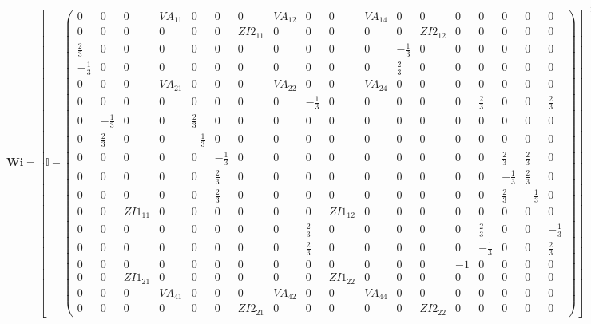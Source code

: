 \[ \mathbf{Wi} =  \left[ \mathbb{I}  - \left(\begin{smallmatrix} 0 & 0
& 0 & VA_{11} & 0 & 0 & 0 & VA_{12} & 0 & 0 & VA_{14} & 0 & 0 & 0 & 0
& 0 & 0 & 0 \\ 0 & 0 & 0 & 0 & 0 & 0 & ZI2_{11} & 0 & 0 & 0 & 0 & 0 &
ZI2_{12} & 0 & 0 & 0 & 0 & 0 \\ \frac{2}{3} & 0 & 0 & 0 & 0 & 0 & 0 &
0 & 0 & 0 & 0 & -\frac{1}{3} & 0 & 0 & 0 & 0 & 0 & 0 \\ -\frac{1}{3} &
0 & 0 & 0 & 0 & 0 & 0 & 0 & 0 & 0 & 0 & \frac{2}{3} & 0 & 0 & 0 & 0 &
0 & 0 \\ 0 & 0 & 0 & VA_{21} & 0 & 0 & 0 & VA_{22} & 0 & 0 & VA_{24} &
0 & 0 & 0 & 0 & 0 & 0 & 0 \\ 0 & 0 & 0 & 0 & 0 & 0 & 0 & 0 &
-\frac{1}{3} & 0 & 0 & 0 & 0 & 0 & \frac{2}{3} & 0 & 0 & \frac{2}{3}
\\ 0 & -\frac{1}{3} & 0 & 0 & \frac{2}{3} & 0 & 0 & 0 & 0 & 0 & 0 & 0
& 0 & 0 & 0 & 0 & 0 & 0 \\ 0 & \frac{2}{3} & 0 & 0 & -\frac{1}{3} & 0
& 0 & 0 & 0 & 0 & 0 & 0 & 0 & 0 & 0 & 0 & 0 & 0 \\ 0 & 0 & 0 & 0 & 0 &
-\frac{1}{3} & 0 & 0 & 0 & 0 & 0 & 0 & 0 & 0 & 0 & \frac{2}{3} &
\frac{2}{3} & 0 \\ 0 & 0 & 0 & 0 & 0 & \frac{2}{3} & 0 & 0 & 0 & 0 & 0
& 0 & 0 & 0 & 0 & -\frac{1}{3} & \frac{2}{3} & 0 \\ 0 & 0 & 0 & 0 & 0
& \frac{2}{3} & 0 & 0 & 0 & 0 & 0 & 0 & 0 & 0 & 0 & \frac{2}{3} &
-\frac{1}{3} & 0 \\ 0 & 0 & ZI1_{11} & 0 & 0 & 0 & 0 & 0 & 0 &
ZI1_{12} & 0 & 0 & 0 & 0 & 0 & 0 & 0 & 0 \\ 0 & 0 & 0 & 0 & 0 & 0 & 0
& 0 & \frac{2}{3} & 0 & 0 & 0 & 0 & 0 & \frac{2}{3} & 0 & 0 &
-\frac{1}{3} \\ 0 & 0 & 0 & 0 & 0 & 0 & 0 & 0 & \frac{2}{3} & 0 & 0 &
0 & 0 & 0 & -\frac{1}{3} & 0 & 0 & \frac{2}{3} \\ 0 & 0 & 0 & 0 & 0 &
0 & 0 & 0 & 0 & 0 & 0 & 0 & 0 & -1 & 0 & 0 & 0 & 0 \\ 0 & 0 & ZI1_{21}
& 0 & 0 & 0 & 0 & 0 & 0 & ZI1_{22} & 0 & 0 & 0 & 0 & 0 & 0 & 0 & 0 \\
0 & 0 & 0 & VA_{41} & 0 & 0 & 0 & VA_{42} & 0 & 0 & VA_{44} & 0 & 0 &
0 & 0 & 0 & 0 & 0 \\ 0 & 0 & 0 & 0 & 0 & 0 & ZI2_{21} & 0 & 0 & 0 & 0
& 0 & ZI2_{22} & 0 & 0 & 0 & 0 & 0 \end{smallmatrix}\right)
\right]^{-1}  \]
